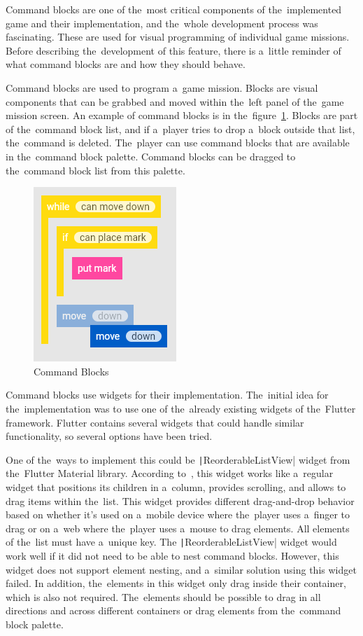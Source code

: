 Command blocks are one of the~most critical components of the~implemented game and their implementation, and the~whole development process was fascinating.
These are used for visual programming of individual game missions.
Before describing the~development of this feature, there is a~little reminder of what command blocks are and how they should behave.

Command blocks are used to program a~game mission.
Blocks are visual components that can be grabbed and moved within the~left panel of the~game mission screen.
An example of command blocks is in the~figure~\ref{fig:commandblocks}.
Blocks are part of the~command block list, and if a~player tries to drop a~block outside that list, the~command is deleted.
The~player can use command blocks that are available in the~command block palette.
Command blocks can be dragged to the~command block list from this palette.

\begin{figure}
    \centering
    \includegraphics[width=0.4\linewidth]{assets/implementation/commandblocks.png}
    \caption{Command Blocks}
    \label{fig:commandblocks}
\end{figure}

Command blocks use widgets for their implementation.
The~initial idea for the~implementation was to use one of the~already existing widgets of the~\mbox{Flutter} framework.
Flutter contains several widgets that could handle similar functionality, so several options have been tried.

One of the~ways to implement this could be \texttt|ReorderableListView| widget from the~Flutter Material library.
According to~\cite{a2022_material}, this widget works like a~regular widget that positions its children in a~column, provides scrolling, and allows to drag items within the~list.
This widget provides different drag-and-drop behavior based on whether it's used on a~mobile device where the~player uses a~finger to drag or on a~web where the~player uses a~mouse to drag elements.
All elements of the~list must have a~unique key.
The \texttt|ReorderableListView| widget would work well if it did not need to be able to nest command blocks.
However, this widget does not support element nesting, and a~similar solution using this widget failed.
In addition, the~elements in this widget only drag inside their container, which is also not required.
The~elements should be possible to drag in all directions and across different containers or drag elements from the~command block palette.

